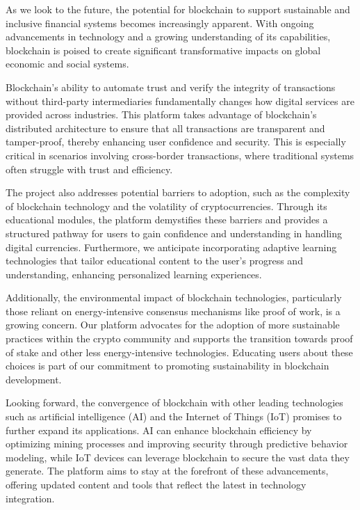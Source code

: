 \documentclass[12pt]{report}
\begin{document}
As we look to the future, the potential for blockchain to support sustainable and inclusive financial systems becomes increasingly apparent. With ongoing advancements in technology and a growing understanding of its capabilities, blockchain is poised to create significant transformative impacts on global economic and social systems.

Blockchain's ability to automate trust and verify the integrity of transactions without third-party intermediaries fundamentally changes how digital services are provided across industries. This platform takes advantage of blockchain's distributed architecture to ensure that all transactions are transparent and tamper-proof, thereby enhancing user confidence and security. This is especially critical in scenarios involving cross-border transactions, where traditional systems often struggle with trust and efficiency.

The project also addresses potential barriers to adoption, such as the complexity of blockchain technology and the volatility of cryptocurrencies. Through its educational modules, the platform demystifies these barriers and provides a structured pathway for users to gain confidence and understanding in handling digital currencies. Furthermore, we anticipate incorporating adaptive learning technologies that tailor educational content to the user’s progress and understanding, enhancing personalized learning experiences.

Additionally, the environmental impact of blockchain technologies, particularly those reliant on energy-intensive consensus mechanisms like proof of work, is a growing concern. Our platform advocates for the adoption of more sustainable practices within the crypto community and supports the transition towards proof of stake and other less energy-intensive technologies. Educating users about these choices is part of our commitment to promoting sustainability in blockchain development.

Looking forward, the convergence of blockchain with other leading technologies such as artificial intelligence (AI) and the Internet of Things (IoT) promises to further expand its applications. AI can enhance blockchain efficiency by optimizing mining processes and improving security through predictive behavior modeling, while IoT devices can leverage blockchain to secure the vast data they generate. The platform aims to stay at the forefront of these advancements, offering updated content and tools that reflect the latest in technology integration.
\end{document}
